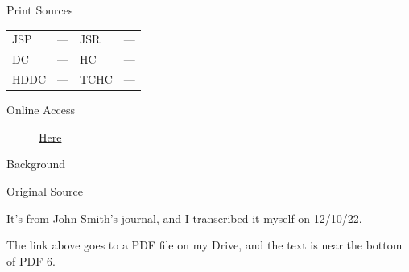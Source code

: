 			\begin{description}
				\item[Print Sources]
			\end{description}

			\begin{tabular}{p{0.5in}p{1in}p{0.5in}p{1in}}
				JSP	 	& ---		& JSR 		& --- \\
				DC	 	& ---		& HC 		& --- \\
				HDDC 	& ---		& TCHC 		& --- \\
			\end{tabular}
			
			\begin{description}
				\item[Online Access] \href{https://drive.google.com/file/d/1jxUt8QswSngeihPE6F9bUCEKcUZP2yYT/view?usp=share_link}{Here}
			\end{description}
			
			\begin{description}
				\item[Background]
			\end{description}
			
			
			\begin{description}
				\item[Original Source]
			\end{description}
			
				It's from John Smith's journal, and I transcribed it myself on 12/10/22.
				
				The link above goes to a PDF file on my Drive, and the text is near the bottom of PDF 6.
			
			
